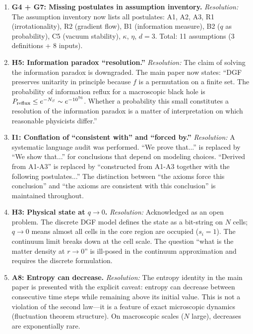 \documentclass[reprint]{revtex4-2}
\begin{document}
\begin{enumerate}[leftmargin=*, label=\textbf{G1:}]
\item \textbf{G4 + G7: Missing postulates in assumption inventory.} \textit{Resolution:} The assumption inventory now lists all postulates: A1, A2, A3, R1 (irrotationality), R2 (gradient flow), B1 (information measure), B2 ($q$ as probability), C5 (vacuum stability), $\kappa$, $\eta$, $d=3$. Total: 11 assumptions (3 definitions + 8 inputs).

\item \textbf{H5: Information paradox ``resolution.''} \textit{Resolution:} The claim of solving the information paradox is downgraded. The main paper now states: ``DGF preserves unitarity in principle because $f$ is a permutation on a finite set. The probability of information reflux for a macroscopic black hole is $P_{\rm reflux} \le e^{-N_S} \sim e^{-10^{76}}$. Whether a probability this small constitutes a resolution of the information paradox is a matter of interpretation on which reasonable physicists differ.''

\item \textbf{I1: Conflation of ``consistent with'' and ``forced by.''} \textit{Resolution:} A systematic language audit was performed. ``We prove that...'' is replaced by ``We show that...'' for conclusions that depend on modeling choices. ``Derived from A1-A3'' is replaced by ``constructed from A1-A3 together with the following postulates...'' The distinction between ``the axioms force this conclusion'' and ``the axioms are consistent with this conclusion'' is maintained throughout.

\item \textbf{H3: Physical state at $q\to0$.} \textit{Resolution:} Acknowledged as an open problem. The discrete DGF model defines the state as a bit-string on $N$ cells; $q\to0$ means almost all cells in the core region are occupied ($s_i=1$). The continuum limit breaks down at the cell scale. The question ``what is the matter density at $r\to0$'' is ill-posed in the continuum approximation and requires the discrete formulation.

\item \textbf{A8: Entropy can decrease.} \textit{Resolution:} The entropy identity in the main paper is presented with the explicit caveat: entropy can decrease between consecutive time steps while remaining above its initial value. This is not a violation of the second law---it is a feature of exact microscopic dynamics (fluctuation theorem structure). On macroscopic scales ($N$ large), decreases are exponentially rare.
\end{enumerate}
\end{document}
